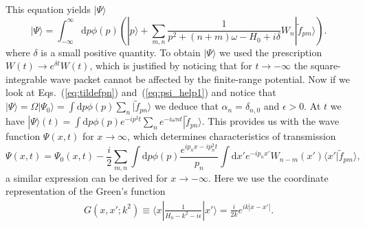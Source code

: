 This equation yields $|\Psi\rangle$
\begin{equation}
|\Psi\rangle=\int_{-\infty}^{\infty}\mathrm{d}p \phi(p)\left(|p\rangle+\sum_{m,n}\frac{1}{p^2+(n+m)\omega-H_0+i\delta}W_{n}|\tilde f_{pm}\rangle\right).
\label{eq:psi_help1}
\end{equation} 
where $\delta$ is a small positive quantity. 	
To obtain $|\Psi\rangle$ we used the prescription $W(t)\to e^{\delta t}W(t)$, which is justified by noticing that for $t\to-\infty$ the square-integrable wave packet cannot be affected by the finite-range potential. Now if we look at Eqs.~(\ref{eq:tildefpn}) and~(\ref{eq:psi_help1}) and notice that
$|\Psi\rangle=\Omega |\Psi_0\rangle=\int \mathrm{d}p \phi(p)\sum_n |\tilde f_{pn}\rangle$ we deduce that $\alpha_n=\delta_{n,0}$ and $\epsilon>0$. At $t$ we have $|\Psi\rangle(t)=\int\mathrm{d}p \phi(p)e^{-ip^2t} \sum_{n}e^{-i\omega n t}|\tilde f_{pn}\rangle$. This provides us with the wave function $\Psi(x,t)$ for $x\to\infty$, which determines characteristics of transmission 
\begin{equation}
\Psi(x,t)=\Psi_0(x,t) -\frac{i}{2}\sum_{m,n}\int\mathrm{d}p\phi(p) \frac{e^{ip_nx - i p_n^2 t }}{p_n} \int\mathrm{d}x' e^{-ip_nx'} W_{n-m}(x')\langle x'|\tilde f_{pm}\rangle,
\label{eq:asymptotics}
\end{equation}
a similar expression can be derived for $x\to-\infty$.
Here we use the coordinate representation of the Green's function
\begin{align}
G(x,x';k^2)\equiv\langle x| \frac{1}{H_0-k^2-i\epsilon}|x'\rangle  = \frac{i}{2k}e^{ik|x-x'|}.
\end{align}


